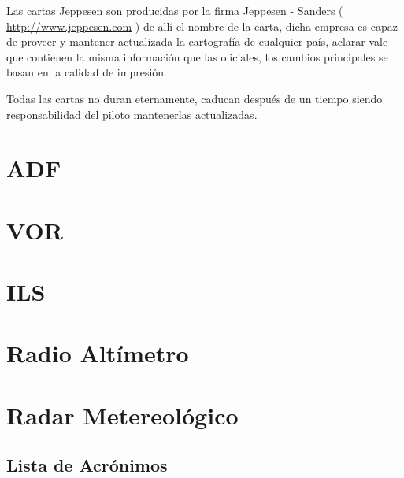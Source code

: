 \documentclass[a4paper,12pt,twoside]{article}
\begin{document}
Las cartas Jeppesen son producidas por la firma Jeppesen - Sanders
(
\url{http://www.jeppesen.com} 
) de all\'i el nombre de la carta, dicha empresa
es capaz de proveer y mantener actualizada la cartograf\'ia de cualquier pa\'is,
aclarar vale que contienen la misma informaci\'on que las oficiales, los cambios
principales se basan en la calidad de impresi\'on.

Todas las cartas no duran eternamente, caducan despu\'es de un tiempo siendo
responsabilidad del piloto mantenerlas actualizadas.


\section{ADF}
\label{sec:adf}

    


\section{VOR}
\label{sec:vor}


\section{ILS}
\label{sec:ils}


\section{Radio Alt\'imetro}
\label{sec:radio.altimetro}


\section{Radar Metereol\'ogico}
\label{sec:radar.metereologico}



\newpage
\begin{appendices}
  \printglossaries

  \newpage

  \section{Lista de Acr\'onimos}
  \label{sec:lista.acronimos}


\end{appendices}

\newpage



%
%
\end{document}
